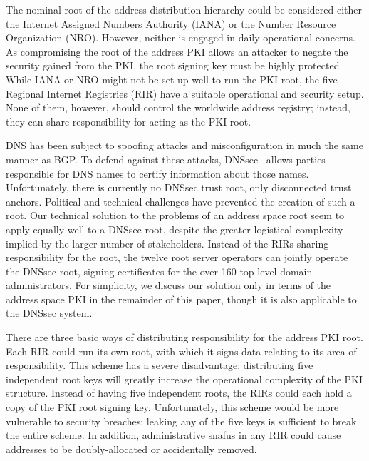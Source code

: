 
The nominal root of the address distribution hierarchy could be considered either the Internet Assigned Numbers Authority (IANA) or the Number Resource Organization (NRO). However, neither is engaged in daily operational concerns. As compromising the root of the address PKI allows an attacker to negate the security gained from the PKI, the root signing key must be highly protected. While IANA or NRO might not be set up well to run the PKI root, the five Regional Internet Registries (RIR) have a suitable operational and security setup. None of them, however, should control the worldwide address registry; instead, they can share responsibility for acting as the PKI root.

DNS has been subject to spoofing attacks and misconfiguration in much the same manner as BGP. To defend against these attacks, DNSsec~\cite{dnssec} allows parties responsible for DNS names to certify information about those names. Unfortunately, there is currently no DNSsec trust root, only disconnected trust anchors. Political and technical challenges have prevented the creation of such a root. Our technical solution to the problems of an address space root seem to apply equally well to a DNSsec root, despite the greater logistical complexity implied by the larger number of stakeholders. Instead of the RIRs sharing responsibility for the root, the twelve root server operators can jointly operate the DNSsec root, signing certificates for the over 160 top level domain administrators. For simplicity, we discuss our solution only in terms of the address space PKI in the remainder of this paper, though it is also applicable to the DNSsec system.

There are three basic ways of distributing responsibility for the address PKI root. Each RIR could run its own root, with which it signs data relating to its area of responsibility. This scheme has a severe disadvantage: distributing five independent root keys will greatly increase the operational complexity of the PKI structure. Instead of having five independent roots, the RIRs could each hold a copy of the PKI root signing key. Unfortunately, this scheme would be more vulnerable to security breaches; leaking any of the five keys is sufficient to break the entire scheme. In addition, administrative snafus in any RIR could cause addresses to be doubly-allocated or accidentally removed.

